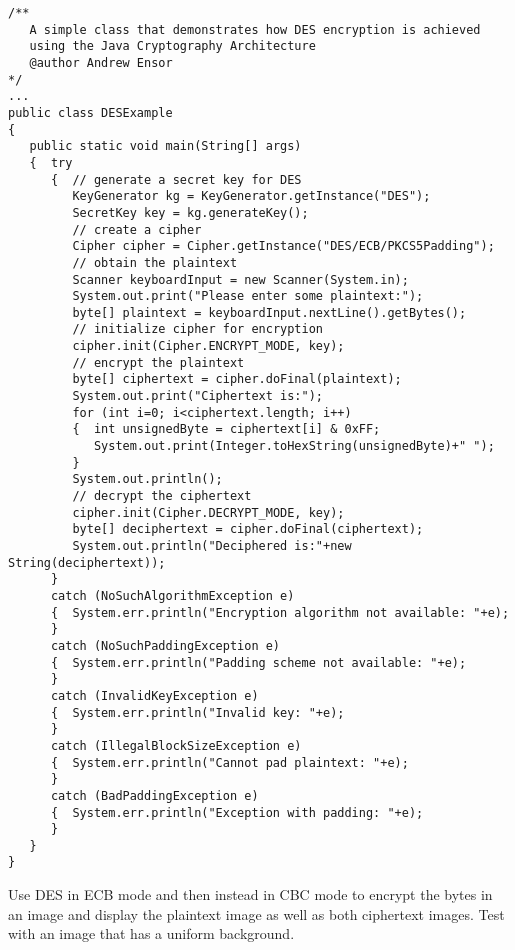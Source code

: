 \begin{figure*}\begin{program}\begin{verbatim}
/**
   A simple class that demonstrates how DES encryption is achieved
   using the Java Cryptography Architecture
   @author Andrew Ensor
*/
...
public class DESExample
{
   public static void main(String[] args)
   {  try
      {  // generate a secret key for DES
         KeyGenerator kg = KeyGenerator.getInstance("DES");
         SecretKey key = kg.generateKey();
         // create a cipher
         Cipher cipher = Cipher.getInstance("DES/ECB/PKCS5Padding");
         // obtain the plaintext
         Scanner keyboardInput = new Scanner(System.in);
         System.out.print("Please enter some plaintext:");
         byte[] plaintext = keyboardInput.nextLine().getBytes();
         // initialize cipher for encryption
         cipher.init(Cipher.ENCRYPT_MODE, key);
         // encrypt the plaintext
         byte[] ciphertext = cipher.doFinal(plaintext);
         System.out.print("Ciphertext is:");
         for (int i=0; i<ciphertext.length; i++)
         {  int unsignedByte = ciphertext[i] & 0xFF;
            System.out.print(Integer.toHexString(unsignedByte)+" ");
         }
         System.out.println();
         // decrypt the ciphertext
         cipher.init(Cipher.DECRYPT_MODE, key);
         byte[] deciphertext = cipher.doFinal(ciphertext);
         System.out.println("Deciphered is:"+new String(deciphertext));
      }
      catch (NoSuchAlgorithmException e)
      {  System.err.println("Encryption algorithm not available: "+e);
      }
      catch (NoSuchPaddingException e)
      {  System.err.println("Padding scheme not available: "+e);
      }
      catch (InvalidKeyException e)
      {  System.err.println("Invalid key: "+e);
      }
      catch (IllegalBlockSizeException e)
      {  System.err.println("Cannot pad plaintext: "+e);
      }
      catch (BadPaddingException e)
      {  System.err.println("Exception with padding: "+e);
      }
   }
}
\end{verbatim}\end{program}\end{figure*}

\begin{exercise}
Use DES in ECB mode and then instead in CBC mode to encrypt the bytes in an image
and display the plaintext image as well as both ciphertext images.
Test with an image that has a uniform background.
\end{exercise}


